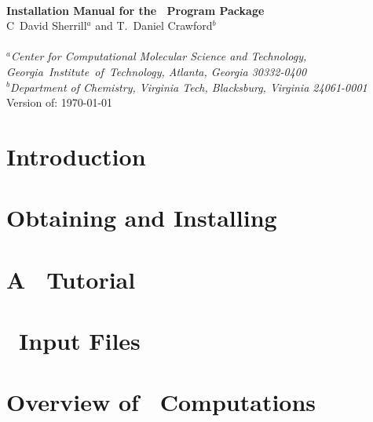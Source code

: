 \documentclass[12pt]{article}
\begin{document}


\begin{center}
\ \\
\vspace{2.0in}
{\bf {\Large Installation Manual for the \PSIthree\ Program Package}} \\
\vspace{0.5in}
C\ David Sherrill$^a$ and T.\ Daniel Crawford$^b$ \\
\ \\
{\em $^a$Center for Computational Molecular Science and Technology, \mbox{Georgia 
Institute of Technology,} Atlanta, Georgia 30332-0400} \\
\vspace{0.1in}
{\em $^b$Department of Chemistry, Virginia Tech, Blacksburg, Virginia 24061-0001}
\ \\
\vspace{0.3in}
Version of: \today
\end{center}

\thispagestyle{empty}

\newpage
\newpage

\section{Introduction} \label{introduction}
%

\section{Obtaining and Installing \PSIthree} \label{installation}
%

\section{A \PSIthree\ Tutorial} \label{tutorial}
%

\section{\PSIthree\ Input Files} \label{input}
%

\section{Overview of \PSIthree\ Computations} \label{overview}
\end{document}
